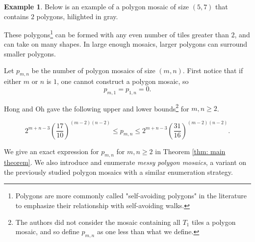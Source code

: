 \documentclass[12pt]{article}
\theoremstyle{plain}
\theoremstyle{definition}
\theoremstyle{remark}
\theoremstyle{definition}
\newtheorem{exmp}{Example}[section]
\newcommand{\cell}[4]{ \draw[thick] ( #1 , #2 ) rectangle ( #3 , #4 );}
\newcommand{\cellAf}[4]{\filldraw[gray!40] ( #1 , #2 ) rectangle ( #3 , #4 ); \draw[thick] ( #1 , #2 ) rectangle ( #3 , #4 ); \draw[red, thick, densely dotted] (#3 * 0.5 + #1 * 0.5 , #2) -- (#3, #4 * 0.5 + #2 * 0.5);}
\newcommand{\cellBf}[4]{\filldraw[gray!40] ( #1 , #2 ) rectangle ( #3 , #4 ); \draw[thick] ( #1 , #2 ) rectangle ( #3 , #4 ); \draw[red, thick, densely dotted] (#3 * 0.5 + #1 * 0.5 , #2) -- (#1, #4 * 0.5 + #2 * 0.5);}
\newcommand{\cellCf}[4]{\filldraw[gray!40] ( #1 , #2 ) rectangle ( #3 , #4 ); \draw[thick] ( #1 , #2 ) rectangle ( #3 , #4 ); \draw[red, thick, densely dotted] (#3 * 0.5 + #1 * 0.5 , #4) -- (#1, #4 * 0.5 + #2 * 0.5);}
\newcommand{\cellDf}[4]{\filldraw[gray!40] ( #1 , #2 ) rectangle ( #3 , #4 ); \draw[thick] ( #1 , #2 ) rectangle ( #3 , #4 ); \draw[red, thick, densely dotted] (#3 * 0.5 + #1 * 0.5 , #4) -- (#3, #4 * 0.5 + #2 * 0.5);}
\newcommand{\cellEf}[4]{\filldraw[gray!40] ( #1 , #2 ) rectangle ( #3 , #4 ); \draw[thick] ( #1 , #2 ) rectangle ( #3 , #4 ); \draw[red, thick, densely dotted] (#3 * 0.5 + #1 * 0.5 , #2) -- (#3 * 0.5 + #1 * 0.5 , #4);}
\newcommand{\cellFf}[4]{\filldraw[gray!40] ( #1 , #2 ) rectangle ( #3 , #4 ); \draw[thick] ( #1 , #2 ) rectangle ( #3 , #4 ); \draw[red, thick, densely dotted] (#3, #4 * 0.5 + #2 * 0.5) -- (#1, #4 * 0.5 + #2 * 0.5);}
\begin{document}
\begin{exmp}
\label{exmp: clean sap}
Below is an example of a polygon mosaic of size $(5,7)$ that contains $2$ polygons, hilighted in gray.

\begin{center}
\end{center}
\end{exmp}

These polygons\footnote{Polygons are more commonly called "self-avoiding polygons" in the literature to emphasize their relationship with self-avoiding walks.} can be formed with any even number of tiles greater than $2$, and can take on many shapes. In large enough mosaics, larger polygons can surround smaller polygons. 

Let $p_{m,n}$ be the number of polygon mosaics of size $(m,n)$. First notice that if either $m$ or $n$ is $1$, one cannot construct a polygon mosaic, so 
$$p_{m,1} = p_{1,n} = 0.$$

Hong and Oh \cite[Hong2018]{Hong2018} gave the following upper and lower bounds\footnote{The authors did not consider the mosaic containing all $T_1$ tiles a polygon mosaic, and so define $p_{m,n}$ as one less than what we define.} for $m,n \geq 2$. 

$$2^{m+n-3} \left(\frac{17}{10}\right)^{(m-2)(n-2)} \leq p_{m,n} \leq 2^{m+n-3} \left(\frac{31}{16}\right)^{(m-2)(n-2)}.$$

We give an exact expression for $p_{m,n}$ for $m,n \geq 2$ in Theorem \ref{thm: main theorem}. We also introduce and enumerate \textit{messy polygon mosaics}, a variant on the previously studied polygon mosaics with a similar enumeration strategy.
\end{document}
